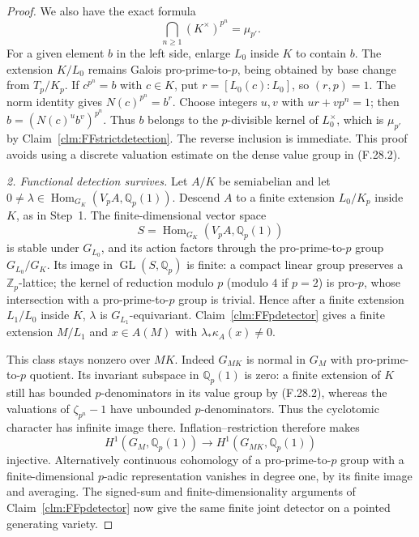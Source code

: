 \documentclass[11pt]{article}
\begin{document}
\begin{proof}
We also have the exact formula
\[
       \bigcap_{n\geq1}(K^\times)^{p^n}=\mu_{p'}.
                                                        \tag{F.28.3}
\]
For a given element \(b\) in the left side, enlarge
\(L_0\) inside \(K\) to contain \(b\). The extension
\(K/L_0\) remains Galois pro-prime-to-\(p\), being
obtained by base change from \(T_p/K_p\). If
\(c^{p^n}=b\) with \(c\in K\), put
\(r=[L_0(c):L_0]\), so \((r,p)=1\). The norm
identity gives \(N(c)^{p^n}=b^r\). Choose integers
\(u,v\) with \(ur+vp^n=1\); then
\(b=(N(c)^u b^v)^{p^n}\). Thus \(b\) belongs to
the \(p\)-divisible kernel of \(L_0^\times\),
which is \(\mu_{p'}\) by Claim~\ref{clm:FFstrictdetection}.
The reverse inclusion is immediate. This proof
avoids using a discrete valuation estimate on the
dense value group in (F.28.2).

\emph{2. Functional detection survives.}
Let \(A/K\) be semiabelian and let
\(0\ne\lambda\in\operatorname{Hom}_{G_K}
(V_pA,\mathbb Q_p(1))\). Descend \(A\) to a
finite extension \(L_0/K_p\) inside \(K\),
as in Step~1. The finite-dimensional vector space
\[
 S=\operatorname{Hom}_{G_K}(V_pA,\mathbb Q_p(1))
\]
is stable under \(G_{L_0}\), and its action factors
through the pro-prime-to-\(p\) group
\(G_{L_0}/G_K\). Its image in
\(\operatorname{GL}(S,\mathbb Q_p)\) is finite:
a compact linear group preserves a \(\mathbb Z_p\)-lattice;
the kernel of reduction modulo \(p\) (modulo \(4\)
if \(p=2\)) is pro-\(p\), whose intersection with
a pro-prime-to-\(p\) group is trivial. Hence after
a finite extension \(L_1/L_0\) inside \(K\),
\(\lambda\) is \(G_{L_1}\)-equivariant.
Claim~\ref{clm:FFpdetector} gives a finite extension
\(M/L_1\) and \(x\in A(M)\) with
\(\lambda_*\kappa_A(x)\ne0\).

This class stays nonzero over \(MK\). Indeed
\(G_{MK}\) is normal in \(G_M\) with
pro-prime-to-\(p\) quotient. Its invariant subspace
in \(\mathbb Q_p(1)\) is zero: a finite extension
of \(K\) still has bounded \(p\)-denominators in
its value group by (F.28.2), whereas the valuations
of \(\zeta_{p^n}-1\) have unbounded
\(p\)-denominators. Thus the cyclotomic character
has infinite image there. Inflation--restriction
therefore makes
\[
 H^1(G_M,\mathbb Q_p(1))\longrightarrow
 H^1(G_{MK},\mathbb Q_p(1))
\]
injective. Alternatively continuous cohomology of
a pro-prime-to-\(p\) group with a finite-dimensional
\(p\)-adic representation vanishes in degree one,
by its finite image and averaging. The signed-sum
and finite-dimensionality arguments of
Claim~\ref{clm:FFpdetector} now give the same finite
joint detector on a pointed generating variety.


\end{proof}
\end{document}
